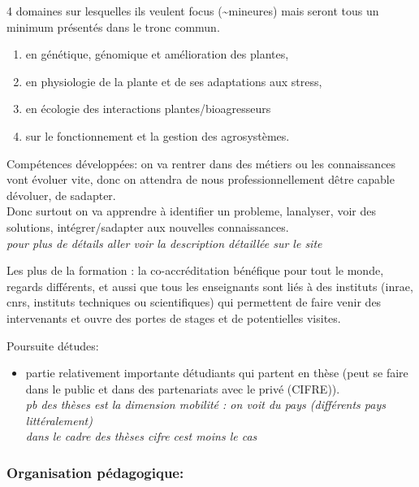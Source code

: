 \documentclass[
]{article}
\providecommand{\tightlist}{%
  \setlength{\itemsep}{0pt}\setlength{\parskip}{0pt}}
\begin{document}
4 domaines sur lesquelles ils veulent focus (\textasciitilde mineures)
mais seront tous un minimum présentés dans le tronc commun.

\begin{enumerate}
\tightlist
\item
  en génétique, génomique et amélioration des plantes,
\item
  en physiologie de la plante et de ses adaptations aux stress,
\item
  en écologie des interactions plantes/bioagresseurs
\item
  sur le fonctionnement et la gestion des agrosystèmes.
\end{enumerate}

Compétences développées: on va rentrer dans des métiers ou les
connaissances vont évoluer vite, donc on attendra de nous
professionnellement d\textquotesingle être capable
d\textquotesingle évoluer, de s\textquotesingle adapter.\\
Donc surtout on va apprendre à identifier un probleme,
l\textquotesingle analyser, voir des solutions,
intégrer/s\textquotesingle adapter aux nouvelles connaissances.\\
\emph{pour plus de détails aller voir la description détaillée sur le
site}

Les plus de la formation : la co-accréditation bénéfique pour tout le
monde, regards différents, et aussi que tous les enseignants sont liés à
des instituts (inrae, cnrs, instituts techniques ou scientifiques) qui
permettent de faire venir des intervenants et ouvre des portes de stages
et de potentielles visites.

Poursuite d\textquotesingle études:

\begin{itemize}
\tightlist
\item
  partie relativement importante d\textquotesingle étudiants qui partent
  en thèse (peut se faire dans le public et dans des partenariats avec
  le privé (CIFRE)).\\
  \emph{pb des thèses est la dimension mobilité : on voit du pays
  (différents pays littéralement)}\\
  \emph{dans le cadre des thèses cifre c\textquotesingle est moins le
  cas}
\end{itemize}

\hypertarget{organisation-puxe9dagogique}{%
\subsubsection{Organisation
pédagogique:}\label{organisation-puxe9dagogique}}
\end{document}
